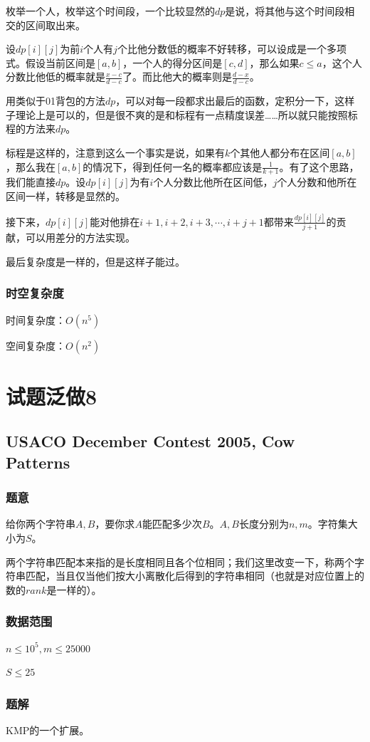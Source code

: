 \documentclass{ctexart}
\begin{document}
枚举一个人，枚举这个时间段，一个比较显然的$dp$是说，将其他与这个时间段相交的区间取出来。

设$dp[i][j]$为前$i$个人有$j$个比他分数低的概率不好转移，可以设成是一个多项式。假设当前区间是$[a,b]$，一个人的得分区间是$[c,d]$，那么如果$c \le a$，这个人分数比他低的概率就是$\frac{x-c}{d-c}$了。而比他大的概率则是$\frac{d-x}{d-c}$。

用类似于01背包的方法$dp$，可以对每一段都求出最后的函数，定积分一下，这样子理论上是可以的，但是很不爽的是和标程有一点精度误差……所以就只能按照标程的方法来$dp$。

标程是这样的，注意到这么一个事实是说，如果有$k$个其他人都分布在区间$[a,b]$，那么我在$[a,b]$的情况下，得到任何一名的概率都应该是$\frac{1}{k+1}$。有了这个思路，我们能直接$dp$。设$dp[i][j]$为有$i$个人分数比他所在区间低，$j$个人分数和他所在区间一样，转移是显然的。

接下来，$dp[i][j]$能对他排在$i+1,i+2,i+3,\cdots,i+j+1$都带来$\frac{dp[i][j]}{j+1}$的贡献，可以用差分的方法实现。

最后复杂度是一样的，但是这样子能过。
\subsubsection{时空复杂度}
时间复杂度：$O(n^5)$

空间复杂度：$O(n^2)$
\newpage
\section{试题泛做8}
\subsection{USACO December Contest 2005, Cow Patterns}
\subsubsection{题意}
给你两个字符串$A,B$，要你求$A$能匹配多少次$B$。$A,B$长度分别为$n,m$。字符集大小为$S$。

两个字符串匹配本来指的是长度相同且各个位相同；我们这里改变一下，称两个字符串匹配，当且仅当他们按大小离散化后得到的字符串相同（也就是对应位置上的数的$rank$是一样的）。
\subsubsection{数据范围}
$n \le 10^5,m \le 25000$

$S \le 25$
\subsubsection{题解}
KMP的一个扩展。
\end{document}
